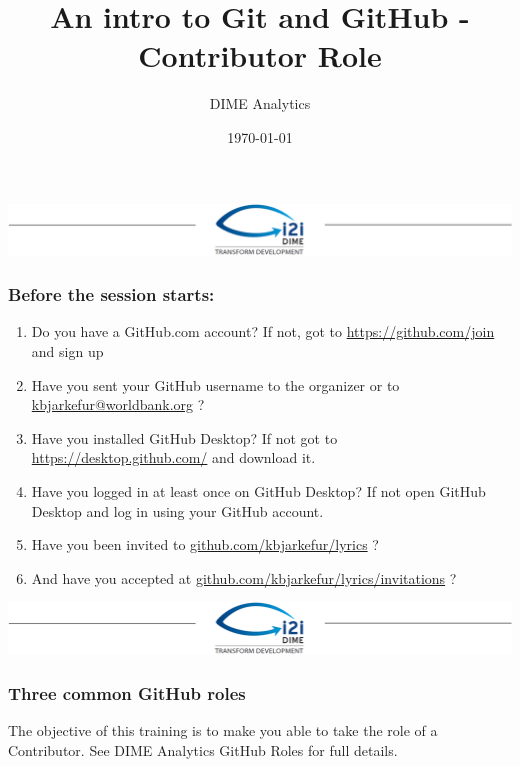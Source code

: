 \documentclass[aspectratio=169]{beamer} %
\title{An intro to Git and GitHub - Contributor Role}
\author{DIME Analytics}
\institute{DIME - The World Bank - \trainingURL{https://www.worldbank.org/en/research/dime}}
\date{\today}
\makeatletter
\newcommand{\trainingURL}[1]{{\color{blue}\url{#1}}}
\newcommand{\traininerUsername}{kbjarkefur}
\newcommand{\repoName}{\traininerUsername/lyrics}
\newcommand{\trainingRepoURL}[1]{\trainingURL{github.com/\repoName #1}}
\newcommand{\trainerEmail}{\trainingURL{kbjarkefur@worldbank.org} }
\makeatother
\begin{document}
\begin{frame}
\includegraphics[width=\textwidth]{../../Common-Resources/img/Header.png}
\vspace{-0.2cm}
\titlepage 	 %
\end{frame}

\begin{frame}
\frametitle{Before the session starts:}
	\begin{enumerate}
		\item Do you have a GitHub.com account? If not, got to \trainingURL{https://github.com/join} and sign up
		\item Have you sent your GitHub username to the organizer or to \trainerEmail?
		\item Have you installed GitHub Desktop? If not got to \trainingURL{https://desktop.github.com/} and download it.
		\item Have you logged in at least once on GitHub Desktop? If not open GitHub Desktop and log in using your GitHub account.
		\item Have you been invited to \trainingRepoURL{} ? 
		\item And have you accepted at \trainingRepoURL{/invitations} ? 
	\end{enumerate}

\end{frame}

\begin{frame}
\includegraphics[width=\textwidth]{../../Common-Resources/img/Header.png}
\vspace{-0.2cm}
\titlepage 	 %
\end{frame}

\begin{frame}
	\frametitle{Three common GitHub roles}
	
	\small The objective of this training is to make you able to take the role of a Contributor. See DIME Analytics GitHub Roles for full details.
	
	

\end{frame}
\end{document}
